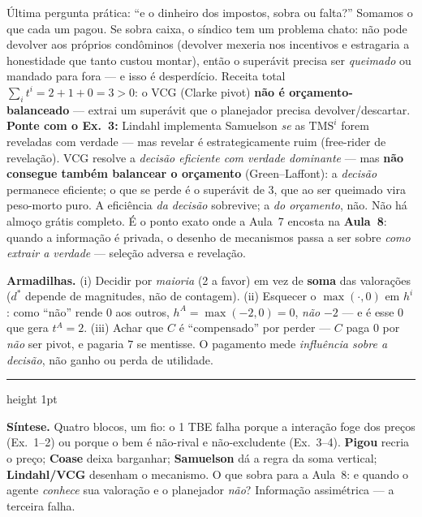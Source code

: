 \documentclass[11pt]{article}
\newcommand{\passo}[1]{\par\medskip\noindent{\bfseries\color{insperdark}#1}\par}
\newcommand{\TMS}{\text{TMS}}
\begin{document}
\passo{Passo 5 --- Saldo do mecanismo e ponte (e).}
Última pergunta prática: ``e o dinheiro dos impostos, sobra ou falta?'' Somamos o que cada um pagou. Se sobra
caixa, o síndico tem um problema chato: não pode devolver aos próprios condôminos (devolver mexeria nos
incentivos e estragaria a honestidade que tanto custou montar), então o superávit precisa ser \emph{queimado} ou
mandado para fora --- e isso é desperdício.
Receita total $\sum_i t^i=2+1+0=3>0$: o VCG (Clarke pivot) \textbf{não é orçamento-balanceado} ---
extrai um superávit que o planejador precisa devolver/descartar. \quad
\textbf{Ponte com o Ex.~3:} Lindahl implementa Samuelson \emph{se} as $\TMS^i$ forem reveladas com verdade ---
mas revelar é estrategicamente ruim (free-rider de revelação). VCG resolve a \emph{decisão eficiente com
verdade dominante} --- mas \textbf{não consegue também balancear o orçamento} (Green--Laffont): a
\emph{decisão} permanece eficiente; o que se perde é o superávit de $3$, que ao ser queimado vira peso-morto
puro. A eficiência \emph{da decisão} sobrevive; a \emph{do orçamento}, não. Não há almoço grátis completo. É o ponto exato onde a Aula~7
encosta na \textbf{Aula~8}: quando a informação é privada, o desenho de mecanismos passa a ser sobre
\emph{como extrair a verdade} --- seleção adversa e revelação.

\begin{armadbox}
\textbf{Armadilhas.} (i) Decidir por \emph{maioria} (2 a favor) em vez de \textbf{soma} das valorações
($d^*$ depende de magnitudes, não de contagem). (ii) Esquecer o $\max(\cdot,0)$ em $h^i$: como ``não'' rende
$0$ aos outros, $h^A=\max(-2,0)=0$, \emph{não} $-2$ --- e é esse $0$ que gera $t^A=2$. (iii) Achar que $C$ é
``compensado'' por perder --- $C$ paga $0$ por \emph{não} ser pivot, e pagaria $7$ se mentisse. O pagamento
mede \emph{influência sobre a decisão}, não ganho ou perda de utilidade.
\end{armadbox}

\bigskip
{\color{insperred!40}\hrule height 1pt}
\smallskip
\noindent\textbf{\color{insperred}Síntese.} Quatro blocos, um fio: o 1\textordmasculine{} TBE
falha porque a interação foge dos preços (Ex.~1--2) ou porque o bem é não-rival e não-excludente (Ex.~3--4).
\textbf{Pigou} recria o preço; \textbf{Coase} deixa barganhar; \textbf{Samuelson} dá a regra da soma vertical;
\textbf{Lindahl/VCG} desenham o mecanismo. O que sobra para a Aula~8: e quando o agente \emph{conhece} sua
valoração e o planejador \emph{não}? Informação assimétrica --- a terceira falha.
\end{document}
